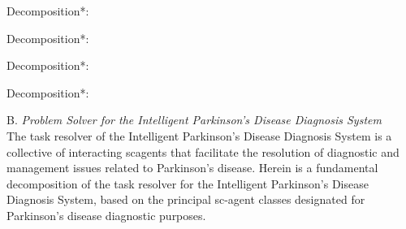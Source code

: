 \documentclass[10pt,two column]{article}
\begin{document}
\begin{SCn}
\begin{scnrelfromset}{Decomposition*:}
{    \begin{scnrelfromset}{Decomposition*:}{
        \begin{scnrelfromset}{Decomposition*:}{
        }
        \end{scnrelfromset}
        \begin{scnrelfromset}{Decomposition*:}{
        }
        \end{scnrelfromset}
    }
    \end{scnrelfromset}
}    
\end{scnrelfromset}
\end{SCn}
B.  \textit{Problem Solver for the Intelligent Parkinson’s Disease Diagnosis System} \\
The task resolver of the Intelligent Parkinson’s Disease Diagnosis System is a collective of interacting scagents that facilitate the resolution of diagnostic and management issues related to Parkinson’s disease. Herein is a fundamental decomposition of the task resolver for the Intelligent Parkinson’s Disease Diagnosis System, based on the principal sc-agent classes designated for Parkinson’s disease diagnostic purposes. 
\end{document}
